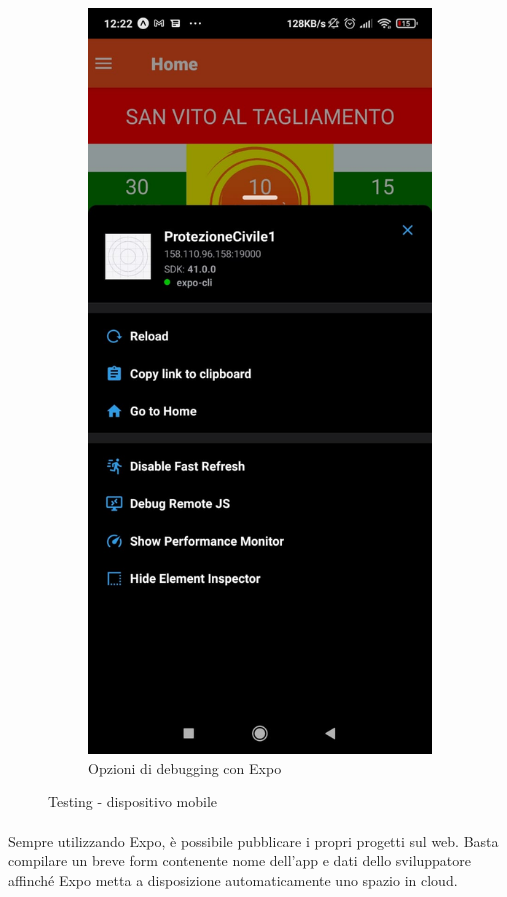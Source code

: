\documentclass[11pt,a4paper,english]{article}
\begin{document}
\begin{figure}[H]
\begin{subfigure}{.4\textwidth}
      \includegraphics[width=0.8\linewidth]{img/debug_app_2.jpeg}
      \caption{Opzioni di debugging con Expo}
    \end{subfigure}
    \caption{Testing - dispositivo mobile}
\end{figure}

\paragraph{} Sempre utilizzando Expo, è possibile pubblicare i propri progetti sul web. Basta compilare un breve form contenente nome dell'app e dati dello sviluppatore affinché Expo metta a disposizione automaticamente uno spazio in cloud. 
\end{document}
